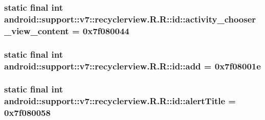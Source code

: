 \hypertarget{classandroid_1_1support_1_1v7_1_1recyclerview_1_1_r_1_1id_5854a87e72eb2344e450ad29e7ea2e1c}{
\subsubsection[{activity\_\-chooser\_\-view\_\-content}]{\setlength{\rightskip}{0pt plus 5cm}static final int android::support::v7::recyclerview.R.R::id::activity\_\-chooser\_\-view\_\-content = 0x7f080044}}
\label{classandroid_1_1support_1_1v7_1_1recyclerview_1_1_r_1_1id_5854a87e72eb2344e450ad29e7ea2e1c}


\hypertarget{classandroid_1_1support_1_1v7_1_1recyclerview_1_1_r_1_1id_fbb622ecc24a9c89b09dc43d0013b554}{
\subsubsection[{add}]{\setlength{\rightskip}{0pt plus 5cm}static final int android::support::v7::recyclerview.R.R::id::add = 0x7f08001e}}
\label{classandroid_1_1support_1_1v7_1_1recyclerview_1_1_r_1_1id_fbb622ecc24a9c89b09dc43d0013b554}


\hypertarget{classandroid_1_1support_1_1v7_1_1recyclerview_1_1_r_1_1id_86f750209f5bcf58edea732b2a14e9c0}{
\subsubsection[{alertTitle}]{\setlength{\rightskip}{0pt plus 5cm}static final int android::support::v7::recyclerview.R.R::id::alertTitle = 0x7f080058}}
\label{classandroid_1_1support_1_1v7_1_1recyclerview_1_1_r_1_1id_86f750209f5bcf58edea732b2a14e9c0}



